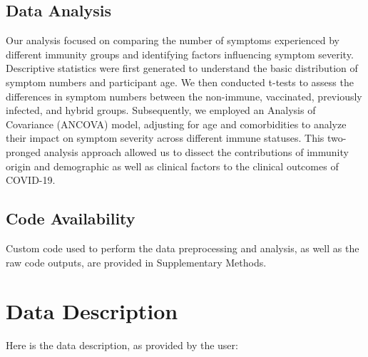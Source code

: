 \documentclass[11pt]{article}
\begin{document}
\subsection*{Data Analysis}
Our analysis focused on comparing the number of symptoms experienced by different immunity groups and identifying factors influencing symptom severity. Descriptive statistics were first generated to understand the basic distribution of symptom numbers and participant age. We then conducted t-tests to assess the differences in symptom numbers between the non-immune, vaccinated, previously infected, and hybrid groups. Subsequently, we employed an Analysis of Covariance (ANCOVA) model, adjusting for age and comorbidities to analyze their impact on symptom severity across different immune statuses. This two-pronged analysis approach allowed us to dissect the contributions of immunity origin and demographic as well as clinical factors to the clinical outcomes of COVID-19.\subsection*{Code Availability}

Custom code used to perform the data preprocessing and analysis, as well as the raw code outputs, are provided in Supplementary Methods.






\clearpage
\appendix

\section{Data Description} \label{sec:data_description} Here is the data description, as provided by the user:
\end{document}
